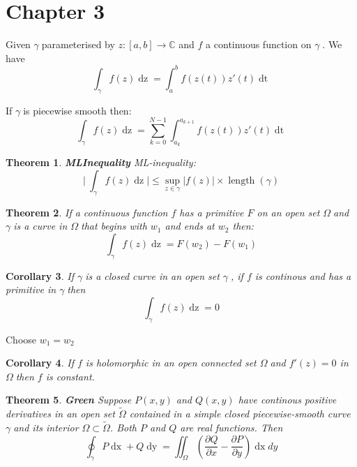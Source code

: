 \documentclass{article}
\newtheorem{theorem}{Theorem}[section]
\newtheorem{corollary}[theorem]{Corollary}
\newenvironment{proof}[1][Proof]{\begin{trivlist}
\item[\hskip \labelsep {\bfseries #1}]}{\end{trivlist}}
\newenvironment{definition}[1][Definition]{\begin{trivlist}
\item[\hskip \labelsep {\bfseries #1}]}{\end{trivlist}}
\newcommand{\C}{\mathbb{C}}
\newcommand{\OO}{$ \Omega \;$}
\newcommand{\GG}{$ \gamma \;$}
\begin{document}
\section*{Chapter 3} %
\setcounter{section}{3}

\begin{definition}
    Given \GG parameterised by $z: [a,b] \rightarrow \C$ and $f$ a continuous function on \GG. We have
    $$\int_\gamma f(z) \mathop{dz} = \int_a^b f(z(t))z'(t) \mathop{dt}$$
\end{definition}

\begin{definition}
    If \GG is piecewise smooth then:
    \[\int_\gamma f(z) \mathop{dz} = \sum_{k = 0}^{N-1}\int_{a_k}^{a_{k+1}}f(z(t))z'(t)\mathop{dt}\]
\end{definition}

\begin{theorem} \label{MLInequality} \textbf{MLInequality}
    ML-inequality:
    \[\biggr\rvert\ \int_\gamma f(z) \mathop{dz} \biggr\rvert \leq \sup_{z\in \gamma}|f(z)| \times \operatorname{length}(\gamma)\]
\end{theorem}

\begin{theorem}
    If a continuous function $f$ has a primitive $F$ on an open set \OO and \GG is a curve in \OO that begins with $w_1$ and ends at $w_2$ then:
    \[\int_\gamma f(z) \mathop{dz} = F(w_2)-F(w_1)\]
\end{theorem}

\begin{corollary}
    If \GG is a closed curve in an open set \GG, if $f$ is continous and has a primitive in \GG then
    \[\int_\gamma f(z) \mathop{dz} = 0\]
\end{corollary}
\begin{proof}
    Choose $w_1 = w_2$
\end{proof}

\begin{corollary}
    If $f$ is holomorphic in an open connected set \OO and $f'(z) = 0$ in \OO then $f$ is constant.
\end{corollary}

\begin{theorem} \label{Green} \textbf{Green}
    Suppose $P(x,y)$ and $Q(x,y)$ have continous positive derivatives in an open set $\tilde{\Omega}$ contained
    in a simple closed piecewise-smooth curve \GG and its interior $\Omega \subset \tilde{\Omega}$. Both $P$ and $Q$ are real functions. Then
    \[\oint_\gamma P \mathop{dx} + Q \mathop{dy} = \iint_\Omega\left(\frac{\partial Q}{\partial x} - \frac{\partial P}{\partial y} \right) \mathop{dx}dy\]
\end{theorem}
\end{document}
